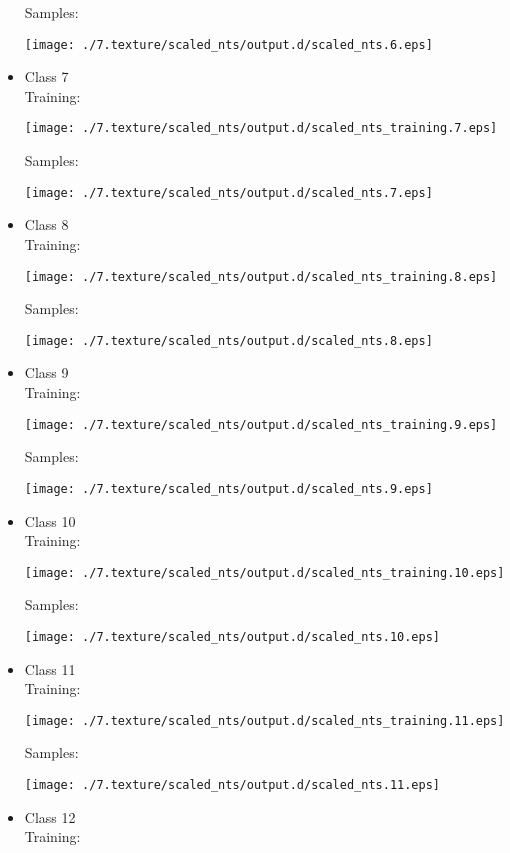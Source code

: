 \documentclass{book}
\begin{document}
\begin{itemize}
Samples:

\texttt{[image: ./7.texture/scaled\_nts/output.d/scaled\_nts.6.eps]}


\item Class 7\\
\label{sec-3_8_1_7}%
Training:

\texttt{[image: ./7.texture/scaled\_nts/output.d/scaled\_nts\_training.7.eps]}

Samples:

\texttt{[image: ./7.texture/scaled\_nts/output.d/scaled\_nts.7.eps]}


\item Class 8\\
\label{sec-3_8_1_8}%
Training:

\texttt{[image: ./7.texture/scaled\_nts/output.d/scaled\_nts\_training.8.eps]}

Samples:

\texttt{[image: ./7.texture/scaled\_nts/output.d/scaled\_nts.8.eps]}


\item Class 9\\
\label{sec-3_8_1_9}%
Training:

\texttt{[image: ./7.texture/scaled\_nts/output.d/scaled\_nts\_training.9.eps]}

Samples:

\texttt{[image: ./7.texture/scaled\_nts/output.d/scaled\_nts.9.eps]}


\item Class 10\\
\label{sec-3_8_1_10}%
Training:

\texttt{[image: ./7.texture/scaled\_nts/output.d/scaled\_nts\_training.10.eps]}

Samples:

\texttt{[image: ./7.texture/scaled\_nts/output.d/scaled\_nts.10.eps]}


\item Class 11\\
\label{sec-3_8_1_11}%
Training:

\texttt{[image: ./7.texture/scaled\_nts/output.d/scaled\_nts\_training.11.eps]}

Samples:

\texttt{[image: ./7.texture/scaled\_nts/output.d/scaled\_nts.11.eps]}


\item Class 12\\
\label{sec-3_8_1_12}%
Training:


\end{itemize}
\end{document}
